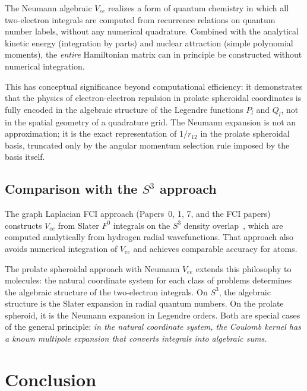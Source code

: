 \documentclass[aps,pra,twocolumn,superscriptaddress,longbibliography]{revtex4-2}
\begin{document}
The Neumann algebraic $V_{ee}$ realizes a form of quantum
chemistry in which all two-electron integrals are computed
from recurrence relations on quantum number labels, without
any numerical quadrature.  Combined with the analytical
kinetic energy (integration by parts) and nuclear attraction
(simple polynomial moments), the \emph{entire} Hamiltonian
matrix can in principle be constructed without numerical
integration.

This has conceptual significance beyond computational
efficiency: it demonstrates that the physics of
electron-electron repulsion in prolate spheroidal
coordinates is fully encoded in the algebraic structure
of the Legendre functions $P_l$ and $Q_l$, not in the
spatial geometry of a quadrature grid.  The Neumann expansion
is not an approximation; it is the exact representation of
$1/r_{12}$ in the prolate spheroidal basis, truncated only
by the angular momentum selection rule imposed by the basis
itself.

\subsection{Comparison with the \texorpdfstring{$S^3$}{S3}
approach}

The graph Laplacian FCI approach (Papers~0, 1, 7, and the
FCI papers) constructs $V_{ee}$ from Slater $F^0$ integrals
on the $S^3$ density overlap~\cite{loutey_paper7}, which are
computed analytically from hydrogen radial wavefunctions.
That approach also avoids numerical integration of $V_{ee}$
and achieves comparable accuracy for atoms.

The prolate spheroidal approach with Neumann $V_{ee}$ extends
this philosophy to molecules: the natural coordinate system
for each class of problems determines the algebraic structure
of the two-electron integrals.  On $S^3$, the algebraic
structure is the Slater expansion in radial quantum numbers.
On the prolate spheroid, it is the Neumann expansion in
Legendre orders.  Both are special cases of the general
principle: \emph{in the natural coordinate system, the
Coulomb kernel has a known multipole expansion that converts
integrals into algebraic sums.}


\section{Conclusion}
\label{sec:conclusion}
\end{document}
